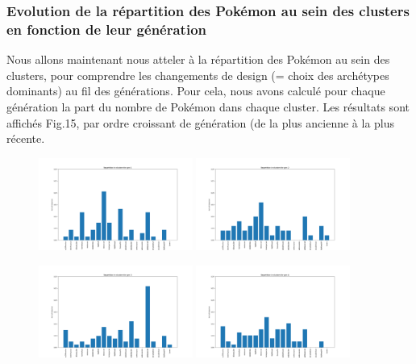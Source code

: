\documentclass[a4paper,12pt]{article}
\begin{document}
\subsubsection{Evolution de la répartition des Pokémon au sein des clusters en fonction de leur génération}

Nous allons maintenant nous atteler à la répartition des Pokémon au sein des clusters, pour comprendre les changements de design (= choix des archétypes dominants) au fil des générations.
Pour cela, nous avons calculé pour chaque génération la part du nombre de Pokémon dans chaque cluster. Les résultats sont affichés Fig.15, par ordre croissant de génération (de la plus ancienne à la plus récente.

\begin{figure}[!h]
    \centering

    \includegraphics[width=0.45\textwidth]{Clustering/number_poke_gen/gen1.png}
    \includegraphics[width=0.45\textwidth]{Clustering/number_poke_gen/gen2.png}
    

    \vspace{1em}  %

    \includegraphics[width=0.45\textwidth]{Clustering/number_poke_gen/gen3.png}
    \includegraphics[width=0.45\textwidth]{Clustering/number_poke_gen/gen4.png}
    


\end{figure}
\end{document}
